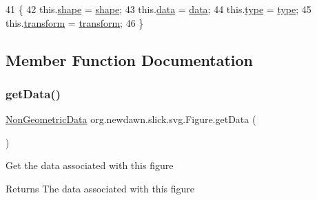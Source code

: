 \begin{DoxyCode}
41                                                                                      \{
42         this.\mbox{\hyperlink{classorg_1_1newdawn_1_1slick_1_1svg_1_1_figure_a8f61c893d97589c745d42f6146d8670e}{shape}} = \mbox{\hyperlink{classorg_1_1newdawn_1_1slick_1_1svg_1_1_figure_a8f61c893d97589c745d42f6146d8670e}{shape}};
43         this.\mbox{\hyperlink{classorg_1_1newdawn_1_1slick_1_1svg_1_1_figure_a31e90c8351882640950687c7e8587091}{data}} = \mbox{\hyperlink{classorg_1_1newdawn_1_1slick_1_1svg_1_1_figure_a31e90c8351882640950687c7e8587091}{data}};
44         this.\mbox{\hyperlink{classorg_1_1newdawn_1_1slick_1_1svg_1_1_figure_a13aa6b5f3b570fcdd83fa792c4df142b}{type}} = \mbox{\hyperlink{classorg_1_1newdawn_1_1slick_1_1svg_1_1_figure_a13aa6b5f3b570fcdd83fa792c4df142b}{type}};
45         this.\mbox{\hyperlink{classorg_1_1newdawn_1_1slick_1_1svg_1_1_figure_a026c30ce2ef9b710c6bd51ff60c0b887}{transform}} = \mbox{\hyperlink{classorg_1_1newdawn_1_1slick_1_1svg_1_1_figure_a026c30ce2ef9b710c6bd51ff60c0b887}{transform}};
46     \}
\end{DoxyCode}


\subsection{Member Function Documentation}
\mbox{\label{classorg_1_1newdawn_1_1slick_1_1svg_1_1_figure_af21423a8fd0c4f77485be8a5de8887eb}} 
\subsubsection{\texorpdfstring{get\+Data()}{getData()}}
{\footnotesize\ttfamily \mbox{\hyperlink{classorg_1_1newdawn_1_1slick_1_1svg_1_1_non_geometric_data}{Non\+Geometric\+Data}} org.\+newdawn.\+slick.\+svg.\+Figure.\+get\+Data (\begin{DoxyParamCaption}{ }\end{DoxyParamCaption})\hspace{0.3cm}{\ttfamily [inline]}}

Get the data associated with this figure

\begin{DoxyReturn}{Returns}
The data associated with this figure 
\end{DoxyReturn}

